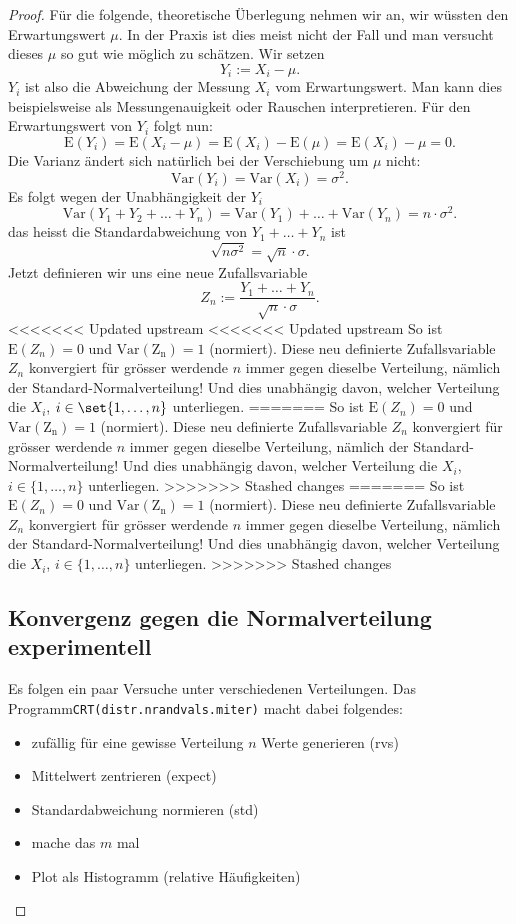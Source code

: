 \documentclass[%
<<<<<<< Updated upstream
<<<<<<< Updated upstream
11pt,%
twoside,%
titlepage,%
german,%
=======
=======
>>>>>>> Stashed changes
11pt,%
twoside,%
titlepage,%
swissgerman,%
<<<<<<< Updated upstream
>>>>>>> Stashed changes
=======
>>>>>>> Stashed changes
headsepline%
]{scrartcl}
\newcommand{\definition}[1]{\colorbox{emerald}{#1}}
\theoremstyle{definition}
\theoremstyle{plain}
\newcounter{theo}[section]\setcounter{theo}{0}
\newcommand{\definition}[1]{\colorbox{emerald}{#1}}
\begin{document}
\begin{proof}
Für die folgende, theoretische Überlegung nehmen wir an, wir wüssten den Erwartungswert $\mu$. In der Praxis ist dies meist nicht der Fall und man versucht dieses $\mu$ so gut wie möglich zu schätzen. Wir setzen
$$Y_i:=X_i-\mu.$$
$Y_i$ ist also die Abweichung der Messung $X_i$ vom Erwartungswert. Man kann dies beispielsweise als Messungenauigkeit oder Rauschen interpretieren. Für den Erwartungswert von $Y_i$ folgt nun:
$$\mathrm{E}(Y_i)=\mathrm{E}(X_i-\mu)=\mathrm{E}(X_i)-\mathrm{E}(\mu)=\mathrm{E}(X_i)-\mu=0.$$
Die Varianz ändert sich natürlich bei der Verschiebung um $\mu$ nicht:
$$\mathrm{Var}(Y_i)=\mathrm{Var}(X_i)=\sigma^2.$$
Es folgt wegen der Unabhängigkeit der $Y_i$
$$\mathrm{Var}(Y_1+Y_2+\dots+Y_n)=\mathrm{Var}(Y_1)+\dots+\mathrm{Var}(Y_n)=n\cdot\sigma^2.$$
das heisst die Standardabweichung von $Y_1+\dots+Y_n$ ist
$$\sqrt{n\sigma^2}=\sqrt{n}\cdot\sigma.$$
Jetzt definieren wir uns eine neue Zufallsvariable
$$Z_n:=\frac{Y_1+\dots+Y_n}{\sqrt{n}\cdot\sigma}.$$
<<<<<<< Updated upstream
<<<<<<< Updated upstream
So ist $\mathrm{E}(Z_n)=0$ und $\mathrm{Var(Z_n)}=1$ (normiert). Diese neu definierte Zufallsvariable $Z_n$ konvergiert für grösser werdende $n$ immer gegen dieselbe Verteilung, nämlich der \definition{Standard-Normalverteilung}! Und dies unabhängig davon, welcher Verteilung die $X_i$, $i\in\set{1,\dots,n}$ unterliegen.
=======
So ist $\mathrm{E}(Z_n)=0$ und $\mathrm{Var(Z_n)}=1$ (normiert). Diese neu definierte Zufallsvariable $Z_n$ konvergiert für grösser werdende $n$ immer gegen dieselbe Verteilung, nämlich der \definition{Standard-Normalverteilung}! Und dies unabhängig davon, welcher Verteilung die $X_i$, $i\in\{1,\dots,n\}$ unterliegen.
>>>>>>> Stashed changes
=======
So ist $\mathrm{E}(Z_n)=0$ und $\mathrm{Var(Z_n)}=1$ (normiert). Diese neu definierte Zufallsvariable $Z_n$ konvergiert für grösser werdende $n$ immer gegen dieselbe Verteilung, nämlich der \definition{Standard-Normalverteilung}! Und dies unabhängig davon, welcher Verteilung die $X_i$, $i\in\{1,\dots,n\}$ unterliegen.
>>>>>>> Stashed changes

\subsection{Konvergenz gegen die Normalverteilung experimentell}

Es folgen ein paar Versuche unter verschiedenen Verteilungen. Das Programm\linebreak \texttt{CRT(distr.nrandvals.miter)} macht dabei folgendes:
\begin{itemize}
    \item zufällig für eine gewisse Verteilung $n$ Werte generieren (rvs)
    \item Mittelwert zentrieren (expect)
    \item Standardabweichung normieren (std)
    \item mache das $m$ mal
    \item Plot als Histogramm (relative Häufigkeiten)
\end{itemize}


\end{proof}
\end{document}
